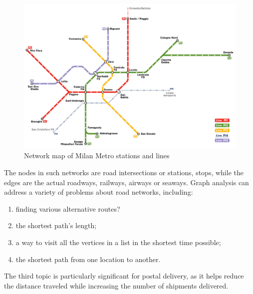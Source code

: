 \begin{figure}[H]%
	\centering%
	\includegraphics[width=1\textwidth-4pt,%
		bgcolor=white,%
		cfbox=lightestgray %
			  2pt %
			  0pt %
			  0pt %
	]{images/chapter2/WikipediaMilanoMetro2021Graphedit.pdf}%
	\caption[Network map of Milan Metro stations and lines]{Network map of \gls{Milan} Metro stations and lines}%
	\label{fig:WikipediaMilanoMetro2021Graphedit}%
\end{figure}%

The nodes in such networks are road intersections or stations, stops, while the edges are the actual roadways, railways, airways or seaways.
Graph analysis can address a variety of problems about road networks, including:
 \begin{enumerate}[noitemsep]
	\item finding various alternative routes?
	\item the shortest path's length;
	\item a way to visit all the vertices in a list in the shortest time possible;
	\item the shortest path from one location to another.
\end{enumerate}
The third topic is particularly significant for \gls{postal delivery}, as it helps reduce the distance traveled while increasing the number of shipments delivered.

